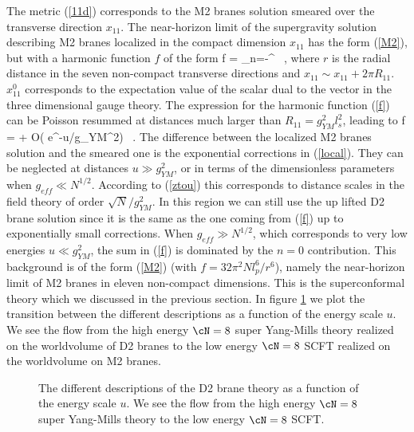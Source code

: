 The metric (\ref{11d}) corresponds to the M2 branes solution smeared
over the transverse direction $x_{11}$.  The near-horizon limit of the
supergravity solution describing M2 branes localized in the compact
dimension $x_{11}$ has the form (\ref{M2}), but with a harmonic
function $f$ of the form
\beq
f = \sum_{n=-\infty}^{\infty}  \ ,
\label{f}
\eeq
where $r$ is the radial distance in the seven non-compact transverse
directions and $x_{11} \sim x_{11} + 2 \pi R_{11}$.  $x_{11}^0$
corresponds to the expectation value of the scalar dual to the vector
in the three dimensional gauge theory.  The expression for the
harmonic function (\ref{f}) can be Poisson resummed at distances much
larger than $R_{11}= g_{YM}^2 l_s^2$, leading to
\beq
f =  + O( e^{-u/g_{YM}^2}) \ .
\label{local}
\eeq 
The difference between the localized M2 branes solution and the
smeared one is the exponential corrections in (\ref{local}). They can
be neglected at distances  $u \gg g_{YM}^2$,  or in terms of the
dimensionless parameters when $g_{eff} \ll N^{1/2}$. 
According to (\ref{ztou}) this corresponds to distance scales in 
the field theory of order $\sqrt{N}/g^2_{YM}$. In this region we
can still use the up lifted D2 brane solution since it is the same
as the one coming from (\ref{f}) up to exponentially small corrections.
 When $g_{eff} \gg N^{1/2}$, which
corresponds to very low energies $u \ll g_{YM}^2$, the sum in
(\ref{f}) is dominated by the $n=0$ contribution.  This background is
of the form (\ref{M2}) (with $f=32\pi^2 Nl_p^6/r^6$), 
namely the near-horizon limit of M2 branes in
eleven non-compact dimensions.  This is the superconformal theory
which we discussed in the previous section.  In figure \ref{regions}
we plot the transition between the different descriptions as a
function of the energy scale $u$.  We see the flow from the high
energy $\cN=8$ super Yang-Mills theory realized on the worldvolume of
D2 branes to the low energy $\cN=8$ SCFT realized on the worldvolume
on M2 branes.

\begin{figure}[htb]
\begin{center}
\epsfxsize=6in\leavevmode{}
\end{center}
\caption{The different descriptions of the D2 brane theory as
a function of the energy scale $u$. 
We see the flow from the high energy $\cN=8$
super Yang-Mills theory to
the low energy $\cN=8$ SCFT. 
}
\label{regions}
\end{figure} 



